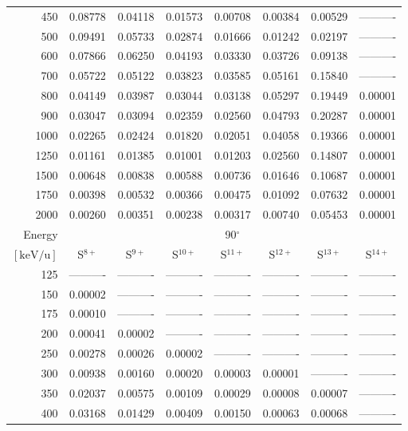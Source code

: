 \begin{table}[ht]
\begin{tabular}{r|c|c|c|c|c|c|c}
      450 & 0.08778 & 0.04118 & 0.01573 & 0.00708 & 0.00384 & 0.00529 & ---------- \\
      500 & 0.09491 & 0.05733 & 0.02874 & 0.01666 & 0.01242 & 0.02197 & ---------- \\
      600 & 0.07866 & 0.06250 & 0.04193 & 0.03330 & 0.03726 & 0.09138 & ---------- \\
      700 & 0.05722 & 0.05122 & 0.03823 & 0.03585 & 0.05161 & 0.15840 & ---------- \\
      800 & 0.04149 & 0.03987 & 0.03044 & 0.03138 & 0.05297 & 0.19449 & 0.00001 \\
      900 & 0.03047 & 0.03094 & 0.02359 & 0.02560 & 0.04793 & 0.20287 & 0.00001 \\
     1000 & 0.02265 & 0.02424 & 0.01820 & 0.02051 & 0.04058 & 0.19366 & 0.00001 \\
     1250 & 0.01161 & 0.01385 & 0.01001 & 0.01203 & 0.02560 & 0.14807 & 0.00001 \\
     1500 & 0.00648 & 0.00838 & 0.00588 & 0.00736 & 0.01646 & 0.10687 & 0.00001 \\
     1750 & 0.00398 & 0.00532 & 0.00366 & 0.00475 & 0.01092 & 0.07632 & 0.00001 \\
     2000 & 0.00260 & 0.00351 & 0.00238 & 0.00317 & 0.00740 & 0.05453 & 0.00001 \\ \cline{1-8}
    Energy & \multicolumn{7}{c}{90$^\circ$} \\ \cline{2-8}
    $\mathrm{[keV/u]}$ & S$^{8+}$ & S$^{9+}$ & S$^{10+}$ & S$^{11+}$ & S$^{12+}$ & S$^{13+}$ & S$^{14+}$ \\ \cline{1-8}
      125 & ---------- & ---------- & ---------- & ---------- & ---------- & ---------- & ---------- \\
      150 & 0.00002 & ---------- & ---------- & ---------- & ---------- & ---------- & ---------- \\
      175 & 0.00010 & ---------- & ---------- & ---------- & ---------- & ---------- & ---------- \\
      200 & 0.00041 & 0.00002 & ---------- & ---------- & ---------- & ---------- & ---------- \\
      250 & 0.00278 & 0.00026 & 0.00002 & ---------- & ---------- & ---------- & ---------- \\
      300 & 0.00938 & 0.00160 & 0.00020 & 0.00003 & 0.00001 & ---------- & ---------- \\
      350 & 0.02037 & 0.00575 & 0.00109 & 0.00029 & 0.00008 & 0.00007 & ---------- \\
      400 & 0.03168 & 0.01429 & 0.00409 & 0.00150 & 0.00063 & 0.00068 & ---------- \\

\end{tabular}
\end{table}
